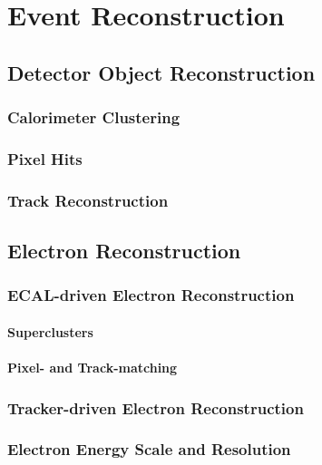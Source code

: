 \chapter{Event Reconstruction}
\section{Detector Object Reconstruction}
\subsection{Calorimeter Clustering}
\subsection{Pixel Hits}
\subsection{Track Reconstruction}
\section{Electron Reconstruction}
\subsection{ECAL-driven Electron Reconstruction}
\subsubsection{Superclusters}
\subsubsection{Pixel- and Track-matching}
\subsection{Tracker-driven Electron Reconstruction}
\subsection{Electron Energy Scale and Resolution}

\clearpage
